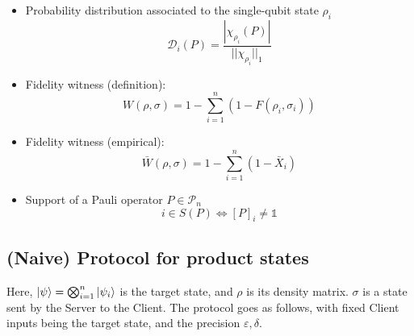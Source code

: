 \documentclass[a4paper,unpublished,onecolumn,11pt]{quantumarticle}
\newcommand{\Pauli}{\mathcal P}
\begin{document}
\begin{itemize}
\begin{equation}
    ||\chi_{\rho_i}||_1 = \sum_{P\in \Pauli_1} |\Tr[\rho_i P]|
    \end{equation}
\item Probability distribution associated to the single-qubit state $\rho_i$
\begin{equation}
    \label{eq: state prob. distribution}
            \mathcal D_i(P) = \dfrac{
        |\chi_{\rho_i}(P)| 
    }{
        ||\chi_{\rho_i}||_1
    }
        \end{equation}
 \item Fidelity witness (definition):
 \begin{equation}
 \label{eq: fidelity witness}
     W(\rho, \sigma) = 1- \sum_{i=1}^n (1 - F(\rho_i, \sigma_i))
 \end{equation}
 \item Fidelity witness (empirical):
 \begin{equation}
 \label{eq: fidelity witness empirical}
     \bar W(\rho, \sigma) = 1- \sum_{i=1}^n (1 - \bar X_i)
 \end{equation}
 \item Support of a Pauli operator $P\in \Pauli_n$
 \begin{equation}
 \label{eq: support of Pauli}
     i\in S(P) \iff [P]_i\neq \mathds{1}
 \end{equation}
\end{itemize}
\subsection{(Naive) Protocol for product states}
Here, $\ket\psi = \bigotimes_{i=1}^n \ket{\psi_i}$ is the target state, and $\rho$ is its density matrix. $\sigma$ is a state sent by the Server to the Client. The protocol goes as follows, with fixed Client inputs being the target state, and the precision $\varepsilon, \delta$.\\
\end{document}
